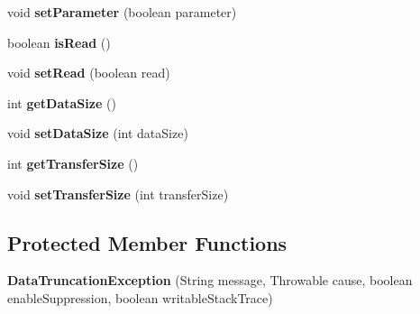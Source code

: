 \begin{DoxyCompactItemize}
void {\bfseries set\+Parameter} (boolean parameter)
\item 
\mbox{\label{classcom_1_1mysql_1_1cj_1_1exceptions_1_1_data_truncation_exception_a56701e2124f6f0da81681347b0a0795e}} 
boolean {\bfseries is\+Read} ()
\item 
\mbox{\label{classcom_1_1mysql_1_1cj_1_1exceptions_1_1_data_truncation_exception_a32b89650fc31560898ee1df04fd37788}} 
void {\bfseries set\+Read} (boolean read)
\item 
\mbox{\label{classcom_1_1mysql_1_1cj_1_1exceptions_1_1_data_truncation_exception_ab7ef3f657d9ddf371c7020059d851249}} 
int {\bfseries get\+Data\+Size} ()
\item 
\mbox{\label{classcom_1_1mysql_1_1cj_1_1exceptions_1_1_data_truncation_exception_a99840fbd7ef6b933ec464f11f431119b}} 
void {\bfseries set\+Data\+Size} (int data\+Size)
\item 
\mbox{\label{classcom_1_1mysql_1_1cj_1_1exceptions_1_1_data_truncation_exception_a0c86c824a310de04621cf6a350fcf919}} 
int {\bfseries get\+Transfer\+Size} ()
\item 
\mbox{\label{classcom_1_1mysql_1_1cj_1_1exceptions_1_1_data_truncation_exception_aeef67895323c5098b53332afba588a07}} 
void {\bfseries set\+Transfer\+Size} (int transfer\+Size)
\end{DoxyCompactItemize}
\subsection*{Protected Member Functions}
\begin{DoxyCompactItemize}
\item 
\mbox{\label{classcom_1_1mysql_1_1cj_1_1exceptions_1_1_data_truncation_exception_ae3640d0efab6cb5bb797f3ec6a30f42c}} 
{\bfseries Data\+Truncation\+Exception} (String message, Throwable cause, boolean enable\+Suppression, boolean writable\+Stack\+Trace)
\end{DoxyCompactItemize}
